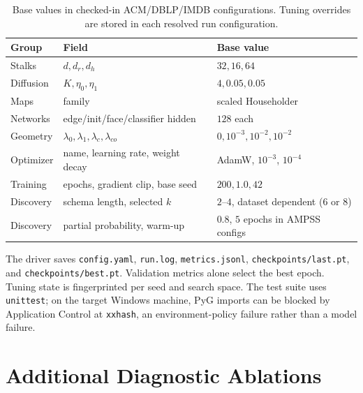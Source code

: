 \documentclass{article}
\begin{document}
\begin{table}[h]
  \centering
  \caption{Base values in checked-in ACM/DBLP/IMDB configurations. Tuning overrides are stored in
  each resolved run configuration.}
  \small
  \begin{tabular}{lll}
    \toprule
    \textbf{Group} & \textbf{Field} & \textbf{Base value} \\
    \midrule
    Stalks & $d,d_r,d_h$ & $32,16,64$ \\
    Diffusion & $K,\eta_0,\eta_1$ & $4,0.05,0.05$ \\
    Maps & family & scaled Householder \\
    Networks & edge/init/face/classifier hidden & $128$ each \\
    Geometry & $\lambda_0,\lambda_1,\lambda_c,\lambda_{co}$ & $0,10^{-3},10^{-2},10^{-2}$ \\
    Optimizer & name, learning rate, weight decay & AdamW, $10^{-3}$, $10^{-4}$ \\
    Training & epochs, gradient clip, base seed & $200,1.0,42$ \\
    Discovery & schema length, selected $k$ & $2$--$4$, dataset dependent ($6$ or $8$) \\
    Discovery & partial probability, warm-up & $0.8$, $5$ epochs in AMPSS configs \\
    \bottomrule
  \end{tabular}
\end{table}

The driver saves \texttt{config.yaml}, \texttt{run.log}, \texttt{metrics.jsonl},
\texttt{checkpoints/last.pt}, and \texttt{checkpoints/best.pt}. Validation metrics alone select the
best epoch. Tuning state is fingerprinted per seed and search space. The test suite uses
\texttt{unittest}; on the target Windows machine, PyG imports can be blocked by Application Control
at \texttt{xxhash}, an environment-policy failure rather than a model failure.

\section{Additional Diagnostic Ablations}
\label{app:ablations}
\end{document}
